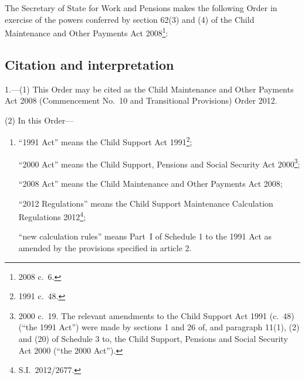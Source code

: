 \documentclass[12pt,a4paper]{article}
\title{\regstitle}
\author{S.I.\ 2012 No.\ 3042 (C.~122)}
\date{Made
5th December 2012
}
\begin{document}
\maketitle

\enlargethispage{\baselineskip}

\noindent
The Secretary of State for Work and Pensions makes the following Order in exercise of the powers conferred by section 62(3) and (4) of the Child Maintenance and Other Payments Act 2008\footnote{2008 c.~6.}: 

{\sloppy

\tableofcontents

}

\bigskip

\setcounter{secnumdepth}{-2}

\subsection[1. Citation and interpretation]{Citation and interpretation}

1.---(1)  This Order may be cited as the Child Maintenance and Other Payments Act 2008 (Commencement No.~10 and Transitional Provisions) Order 2012.

(2) In this Order—
\begin{enumerate}\item[]
“1991 Act” means the Child Support Act 1991\footnote{1991 c.~48.};

“2000 Act” means the Child Support, Pensions and Social Security Act 2000\footnote{2000 c.~19. The relevant amendments to the Child Support Act 1991 (c.~48) (“the 1991 Act”) were made by sections 1 and 26 of, and paragraph 11(1), (2) and (20) of Schedule 3 to, the Child Support, Pensions and Social Security Act 2000 (“the 2000 Act”).};

“2008 Act” means the Child Maintenance and Other Payments Act 2008;

“2012 Regulations” means the Child Support Maintenance Calculation Regulations 2012\footnote{S.I.~2012/2677.};

“new calculation rules” means Part~I of Schedule 1 to the 1991 Act as amended by the provisions specified in article 2.
\end{enumerate}
\end{document}
